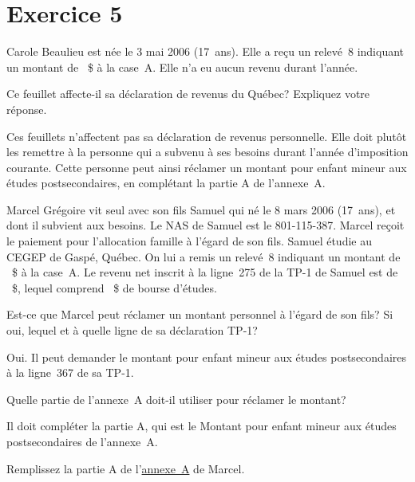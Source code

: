 \section{Exercice 5}
\setcounter{question}{0}
\begin{question}
	Carole Beaulieu est née le 3 mai 2006 (17~ans). Elle a reçu un relevé~8 indiquant un montant de ~\$ à la case~A. Elle n'a eu aucun revenu durant l'année. 
	
	Ce feuillet affecte-il sa déclaration de revenus du Québec? Expliquez votre réponse.
\end{question}
Ces feuillets n'affectent pas sa déclaration de revenus personnelle. Elle doit plutôt les remettre à la personne qui a subvenu à ses besoins durant l'année d'imposition courante. Cette personne peut ainsi réclamer un montant pour enfant mineur aux études postsecondaires, en complétant la partie A de l'annexe~A.

\begin{question}
	Marcel Grégoire vit seul avec son fils Samuel qui né le 8 mars 2006 (17~ans), et dont il subvient aux besoins. Le NAS de Samuel est le 801-115-387. Marcel reçoit le paiement pour l'allocation famille à l'égard de son fils. Samuel étudie au CEGEP de Gaspé, Québec. On lui a remis un relevé~8 indiquant un montant de ~\$ à la case~A. Le revenu net inscrit à la ligne~275 de la TP-1 de Samuel est de ~\$, lequel comprend ~\$ de bourse d'études.
\end{question}
\setcounter{sousQuestion}{0}
\begin{sousQuestion}
	Est-ce que Marcel peut réclamer un montant personnel à l'égard de son fils? Si oui, lequel et à quelle ligne de sa déclaration TP-1?
\end{sousQuestion}
Oui. Il peut demander le montant pour enfant mineur aux études postsecondaires à la ligne~367 de sa TP-1.

\begin{sousQuestion}
	Quelle partie de l'annexe~A doit-il utiliser pour réclamer le montant?
\end{sousQuestion}
Il doit compléter la partie A, qui est le \og Montant pour enfant mineur aux études postsecondaires \fg{} de l'annexe~A.

\begin{sousQuestion}
	Remplissez la partie A de l'\href{https://www.revenuquebec.ca/documents/fr/formulaires/tp/2023-12/TP-1.D.A%282023-12%29.pdf}{annexe~A} de Marcel.
\end{sousQuestion}


